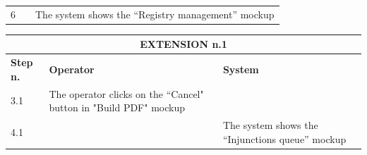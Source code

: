 {{{\begin{table}[h]
\begin{tabular}{|p{2cm}|p{6cm}|p{6cm}|}
				\vspace{1mm} \vspace{1mm} \\
			\hline
				\vspace{1mm} 6\vspace{1mm} &
				\vspace{1mm} \vspace{1mm} & 
				\vspace{1mm} The system shows the “Registry management” mockup\vspace{1mm} \\
			\hline
			\end{tabular}
			\end{table}
			
			\begin{table}[h]
			\begin{tabular}{|p{2cm}|p{6cm}|p{6cm}|}
			\hline
				\multicolumn{3}{|c|}{EXTENSION n.1}\\
			\hline
				\centering \vspace{1mm} \bfseries{Step n.} \vspace{1mm} & \vspace{1mm} \bfseries{Operator} \vspace{1mm} & \vspace{1mm} \bfseries{System} \vspace{1mm}\\
			\hline
				\vspace{1mm} 3.1\vspace{1mm} &
				\vspace{1mm} The operator clicks on the “Cancel" button in "Build PDF" mockup\vspace{1mm} & 
				\vspace{1mm} \vspace{1mm} \\
			\hline
				\vspace{1mm} 4.1\vspace{1mm} &
				\vspace{1mm} \vspace{1mm} & 
				\vspace{1mm} The system shows the “Injunctions queue” mockup\vspace{1mm} \\
			\hline
			\end{tabular}
			\end{table}
			\begin{table}[h]
			\begin{tabular}{|p{2cm}|p{6cm}|p{6cm}|}
			\hline

\end{tabular}
\end{table}}}}
